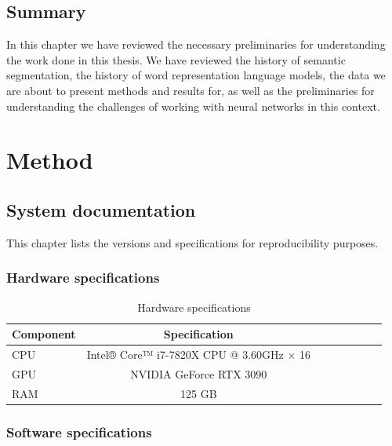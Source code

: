 \documentclass[oneside, english, bibtex]{kththesis}
\begin{document}
\section{Summary}

In this chapter we have reviewed the necessary preliminaries for understanding the work done in this thesis. We have reviewed the history of semantic segmentation, the history of word representation language models, the data we are about to present methods and results for, as well as the preliminaries for understanding the challenges of working with neural networks in this context.

\clearpage


\chapter{Method}
\label{ch:method}

\section{System documentation}
\label{sec:sysdoc}

This chapter lists the versions and specifications for reproducibility purposes.

\subsection{Hardware specifications}

\begin{table}[!ht]
  \begin{center}
    \caption{Hardware specifications}
        \begin{tabular}{l*{6}{c}r}
        \label{tab:hardwarestats}
        \textbf{Component} & \textbf{Specification} & \\
        \hline
        CPU & Intel® Core™ i7-7820X CPU @ 3.60GHz × 16 & \\
        GPU & NVIDIA GeForce RTX 3090 & \\
        RAM & 125 GB \\
        \end{tabular}
  \end{center}
\end{table}


\subsection{Software specifications}
\end{document}
